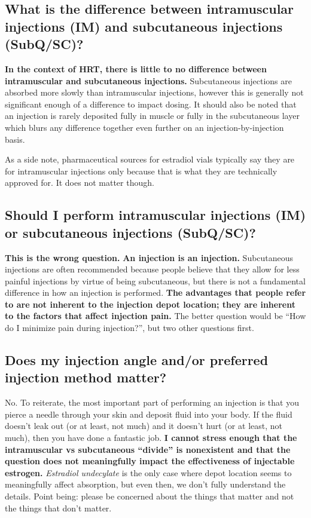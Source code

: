 \documentclass{article}
\begin{document}
\subsection{What is the difference between intramuscular injections (IM) and subcutaneous injections (SubQ/SC)?}

\textbf{In the context of HRT, there is little to no difference between intramuscular and subcutaneous injections.} Subcutaneous injections are absorbed more slowly than intramuscular injections, however this is generally not significant enough of a difference to impact dosing. It should also be noted that an injection is rarely deposited fully in muscle or fully in the subcutaneous layer which blurs any difference together even further on an injection-by-injection basis.

As a side note, pharmaceutical sources for estradiol vials typically say they are for intramuscular injections only because that is what they are technically approved for. It does not matter though.

\subsection{Should I perform intramuscular injections (IM) or subcutaneous injections (SubQ/SC)?}

\textbf{This is the wrong question.} \textbf{An injection is an injection.} Subcutaneous injections are often recommended because people believe that they allow for less painful injections by virtue of being subcutaneous, but there is not a fundamental difference in how an injection is performed. \textbf{The advantages that people refer to are not inherent to the injection depot location; they are inherent to the factors that affect injection pain.} The better question would be “How do I minimize pain during injection?”, but two other questions first.

\subsection{Does my injection angle and/or preferred injection method matter?}

No. To reiterate, the most important part of performing an injection is that you pierce a needle through your skin and deposit fluid into your body. If the fluid doesn’t leak out (or at least, not much) and it doesn’t hurt (or at least, not much), then you have done a fantastic job. \textbf{I cannot stress enough that the intramuscular vs subcutaneous “divide” is nonexistent and that the question does not meaningfully impact the effectiveness of injectable estrogen.} \textit{Estradiol undecylate} is the only case where depot location seems to meaningfully affect absorption, but even then, we don’t fully understand the details. Point being: please be concerned about the things that matter and not the things that don’t matter.
\end{document}
